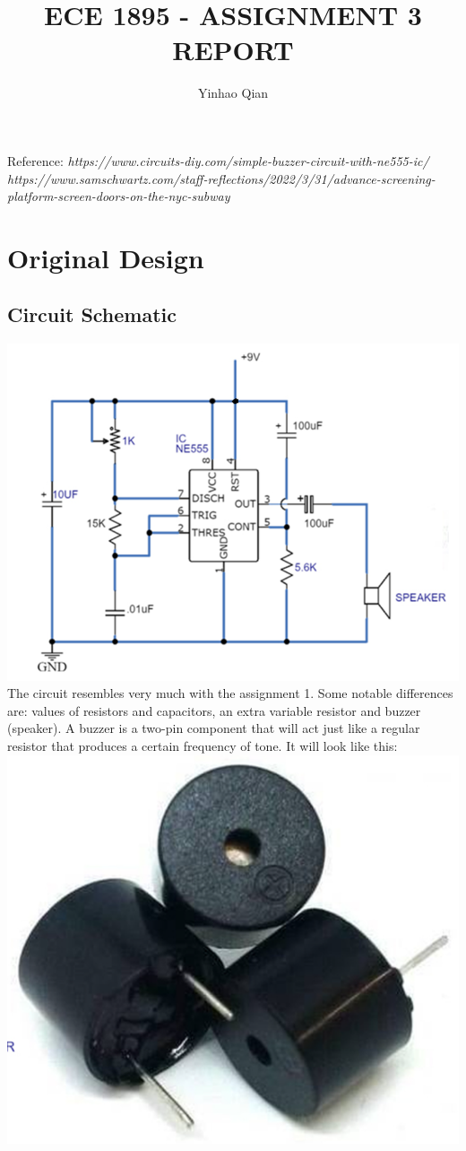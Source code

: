 \documentclass{article}
\title{ECE 1895 - ASSIGNMENT 3 REPORT}
\author{Yinhao Qian}
\begin{document}
	\maketitle
	\noindent
	Reference:
	\newline
	\textit{https://www.circuits-diy.com/simple-buzzer-circuit-with-ne555-ic/}\newline
	\textit{https://www.samschwartz.com/staff-reflections/2022/3/31/advance-screening-platform-screen-doors-on-the-nyc-subway}
	\section{Original Design}
	\subsection{Circuit Schematic}
	\includegraphics[width=\columnwidth]{SCHE_ORIG}
	The circuit resembles very much with the assignment 1. Some notable differences are: values of resistors and capacitors, an extra variable resistor and buzzer (speaker). A buzzer is a two-pin component that will act just like a regular resistor that produces a certain frequency of tone. It will look like this:\newline
	\includegraphics[width=\columnwidth]{BUZZ}
\end{document}
